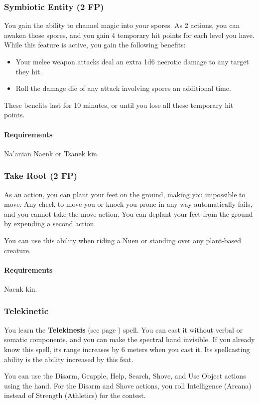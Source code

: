 \subsubsection{Symbiotic Entity (2 FP)} \label{feat::symbioticentity}
    You gain the ability to channel magic into your spores.
    As 2 actions, you can awaken those spores, and you gain 4 temporary hit points for each level you have.
    While this feature is active, you gain the following benefits:
    \begin{itemize}
        \item Your melee weapon attacks deal an extra 1d6 necrotic damage to any target they hit.
        \item Roll the damage die of any attack involving spores an additional time.
    \end{itemize}
    These benefits last for 10 minutes, or until you lose all these temporary hit points.
    \paragraph{Requirements} Na'anian Naenk or Tsanek kin.
\subsubsection{Take Root (2 FP)} \label{feat::takeroot}
    As an action, you can plant your feet on the ground, making you impossible to move.
    Any check to move you or knock you prone in any way automatically fails, and you cannot take the move action.
    You can deplant your feet from the ground by expending a second action.

    You can use this ability when riding a Nuen or standing over any plant-based creature.
    \paragraph{Requirements} Naenk kin.
\subsubsection{Telekinetic} \label{feat::telekinetic}
    You learn the \textbf{Telekinesis} (see page \pageref{spell::telekinesis}) spell.
    You can cast it without verbal or somatic components, and you can make the spectral hand invisible.
    If you already know this spell, its range increases by 6 meters when you cast it.
    Its spellcasting ability is the ability increased by this feat.

    You can use the Disarm, Grapple, Help, Search, Shove, and Use Object actions using the hand.
    For the Disarm and Shove actions, you roll Intelligence (Arcana) instead of Strength (Athletics) for the contest.

